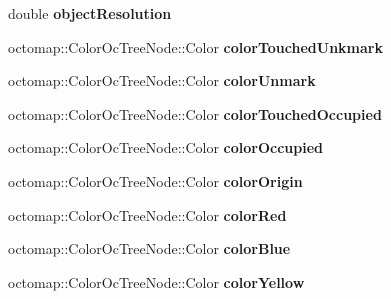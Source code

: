 \begin{DoxyCompactItemize}
\item 
double {\bfseries object\+Resolution}\hypertarget{classPartialModelBase_a92013313bd02b16e61aba3bf9f760b22}{}\label{classPartialModelBase_a92013313bd02b16e61aba3bf9f760b22}

\item 
octomap\+::\+Color\+Oc\+Tree\+Node\+::\+Color {\bfseries color\+Touched\+Unkmark}\hypertarget{classPartialModelBase_a6833d636183943316502be017daba2b3}{}\label{classPartialModelBase_a6833d636183943316502be017daba2b3}

\item 
octomap\+::\+Color\+Oc\+Tree\+Node\+::\+Color {\bfseries color\+Unmark}\hypertarget{classPartialModelBase_a2591b8750489f9f2b1b898711388bf32}{}\label{classPartialModelBase_a2591b8750489f9f2b1b898711388bf32}

\item 
octomap\+::\+Color\+Oc\+Tree\+Node\+::\+Color {\bfseries color\+Touched\+Occupied}\hypertarget{classPartialModelBase_a3544535ffa1c7fae434735c97e9147a6}{}\label{classPartialModelBase_a3544535ffa1c7fae434735c97e9147a6}

\item 
octomap\+::\+Color\+Oc\+Tree\+Node\+::\+Color {\bfseries color\+Occupied}\hypertarget{classPartialModelBase_a4bfcfdc604af2c2196612edb5d19bfdb}{}\label{classPartialModelBase_a4bfcfdc604af2c2196612edb5d19bfdb}

\item 
octomap\+::\+Color\+Oc\+Tree\+Node\+::\+Color {\bfseries color\+Origin}\hypertarget{classPartialModelBase_a05d28173631115d6fb29390584417d49}{}\label{classPartialModelBase_a05d28173631115d6fb29390584417d49}

\item 
octomap\+::\+Color\+Oc\+Tree\+Node\+::\+Color {\bfseries color\+Red}\hypertarget{classPartialModelBase_ae0780d9053f3d00fe343a30dffc70a11}{}\label{classPartialModelBase_ae0780d9053f3d00fe343a30dffc70a11}

\item 
octomap\+::\+Color\+Oc\+Tree\+Node\+::\+Color {\bfseries color\+Blue}\hypertarget{classPartialModelBase_aecb8c1bc3914c487ec812edcd7cd68cc}{}\label{classPartialModelBase_aecb8c1bc3914c487ec812edcd7cd68cc}

\item 
octomap\+::\+Color\+Oc\+Tree\+Node\+::\+Color {\bfseries color\+Yellow}\hypertarget{classPartialModelBase_aa77bffd7d1e4506533729ccc372eac9c}{}\label{classPartialModelBase_aa77bffd7d1e4506533729ccc372eac9c}


\end{DoxyCompactItemize}
